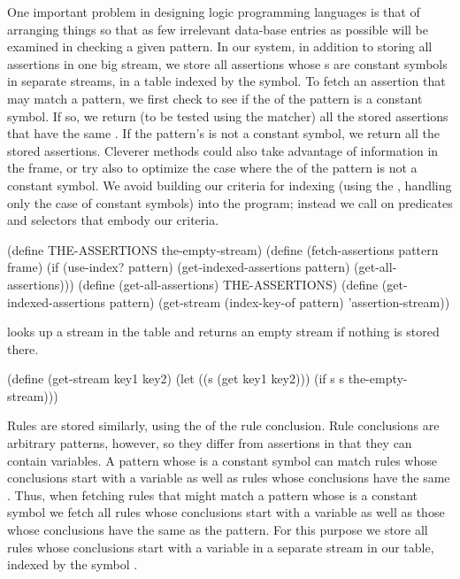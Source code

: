 One important problem in designing logic programming languages is that of
arranging things so that as few irrelevant data-base entries as possible will
be examined in checking a given pattern.  In our system, in addition to storing
all assertions in one big stream, we store all assertions whose s are
constant symbols in separate streams, in a table indexed by the symbol.  To
fetch an assertion that may match a pattern, we first check to see if the
 of the pattern is a constant symbol.  If so, we return (to be tested
using the matcher) all the stored assertions that have the same .  If
the pattern's  is not a constant symbol, we return all the stored
assertions.  Cleverer methods could also take advantage of information in the
frame, or try also to optimize the case where the  of the pattern is
not a constant symbol.  We avoid building our criteria for indexing (using the
, handling only the case of constant symbols) into the program;
instead we call on predicates and selectors that embody our criteria.

\begin{codeBlock}
(define THE-ASSERTIONS the-empty-stream)
(define (fetch-assertions pattern frame)
  (if (use-index? pattern)
      (get-indexed-assertions pattern)
      (get-all-assertions)))
(define (get-all-assertions) THE-ASSERTIONS)
(define (get-indexed-assertions pattern)
  (get-stream (index-key-of pattern) 'assertion-stream))
\end{codeBlock}

\noindent
{} looks up a stream in the table and returns an empty stream if
nothing is stored there.

\begin{codeBlock}
(define (get-stream key1 key2)
  (let ((s (get key1 key2)))
    (if s s the-empty-stream)))
\end{codeBlock}

\noindent
Rules are stored similarly, using the  of the rule conclusion.  Rule
conclusions are arbitrary patterns, however, so they differ from assertions in
that they can contain variables.  A pattern whose  is a constant
symbol can match rules whose conclusions start with a variable as well as rules
whose conclusions have the same .  Thus, when fetching rules that
might match a pattern whose  is a constant symbol we fetch all rules
whose conclusions start with a variable as well as those whose conclusions have
the same  as the pattern.  For this purpose we store all rules whose
conclusions start with a variable in a separate stream in our table, indexed by
the symbol .

